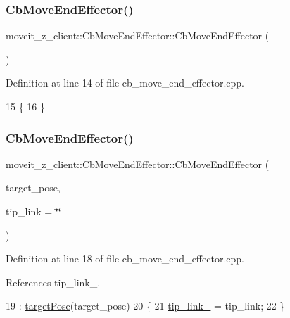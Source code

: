 \subsubsection{\texorpdfstring{Cb\+Move\+End\+Effector()}{CbMoveEndEffector()}\hspace{0.1cm}{\footnotesize\ttfamily [1/2]}}
{\footnotesize\ttfamily moveit\+\_\+z\+\_\+client\+::\+Cb\+Move\+End\+Effector\+::\+Cb\+Move\+End\+Effector (\begin{DoxyParamCaption}{ }\end{DoxyParamCaption})}



Definition at line 14 of file cb\+\_\+move\+\_\+end\+\_\+effector.\+cpp.


\begin{DoxyCode}
15 \{
16 \}
\end{DoxyCode}
\mbox{\label{classmoveit__z__client_1_1CbMoveEndEffector_a688d63425a7a67c3f26d1ae90733ccb1}} 
\subsubsection{\texorpdfstring{Cb\+Move\+End\+Effector()}{CbMoveEndEffector()}\hspace{0.1cm}{\footnotesize\ttfamily [2/2]}}
{\footnotesize\ttfamily moveit\+\_\+z\+\_\+client\+::\+Cb\+Move\+End\+Effector\+::\+Cb\+Move\+End\+Effector (\begin{DoxyParamCaption}\item[{geometry\+\_\+msgs\+::\+Pose\+Stamped}]{target\+\_\+pose,  }\item[{std\+::string}]{tip\+\_\+link = {\ttfamily \char`\"{}\char`\"{}} }\end{DoxyParamCaption})}



Definition at line 18 of file cb\+\_\+move\+\_\+end\+\_\+effector.\+cpp.



References tip\+\_\+link\+\_\+.


\begin{DoxyCode}
19   : \hyperlink{classmoveit__z__client_1_1CbMoveEndEffector_abea9c6077733077baced34c6098c6140}{targetPose}(target\_pose)
20 \{
21   \hyperlink{classmoveit__z__client_1_1CbMoveEndEffector_abd92e9d3d67bdde11f9e38e0b44a2b8b}{tip\_link\_} = tip\_link;
22 \}
\end{DoxyCode}


